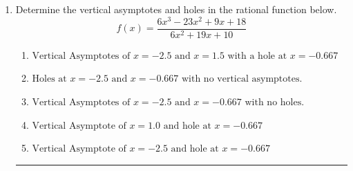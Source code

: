 \documentclass[14pt]{extbook}
\newcommand{\litem}[1]{\item#1\hspace*{-1cm}\rule{\textwidth}{0.4pt}}
\begin{document}
\begin{enumerate}
{\begin{enumerate}[label=\Alph*.]
\end{enumerate} }
\litem{
Determine the vertical asymptotes and holes in the rational function below.\[ f(x) = \frac{6x^{3} -23 x^{2} +9 x + 18}{6x^{2} +19 x + 10} \]\begin{enumerate}[label=\Alph*.]
\item \( \text{Vertical Asymptotes of } x = -2.5 \text{ and } x = 1.5 \text{ with a hole at } x = -0.667 \)
\item \( \text{Holes at } x = -2.5 \text{ and } x = -0.667 \text{ with no vertical asymptotes.} \)
\item \( \text{Vertical Asymptotes of } x = -2.5 \text{ and } x = -0.667 \text{ with no holes.} \)
\item \( \text{Vertical Asymptote of } x = 1.0 \text{ and hole at } x = -0.667 \)
\item \( \text{Vertical Asymptote of } x = -2.5 \text{ and hole at } x = -0.667 \)

\end{enumerate} }
\end{enumerate}
\end{document}
